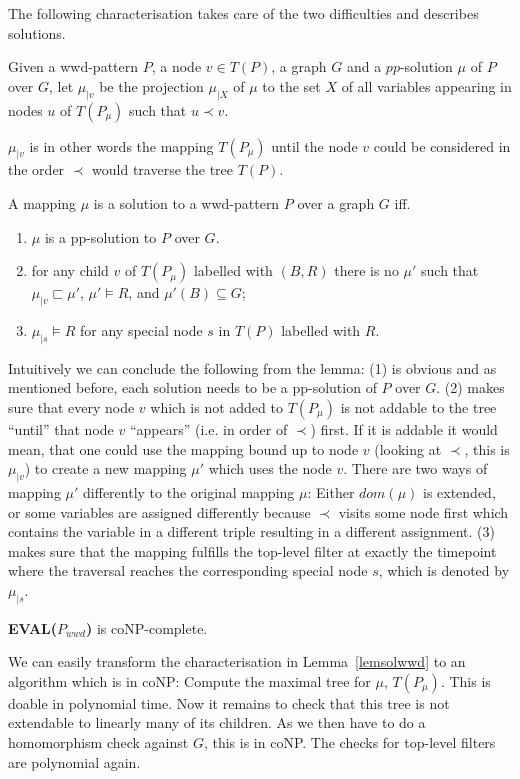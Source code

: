 The following characterisation takes care of the two difficulties and describes
solutions.
\begin{definition}
	Given a wwd-pattern $P$, a node $v \in T(P)$, a graph $G$ and a
	$pp$-solution $\mu$ of $P$ over $G$, let $\mu_{|v}$ be the projection
	$\mu_{|X}$ of $\mu$ to the set $X$ of all variables appearing in nodes $u$
	of $T(P_\mu)$ such that $u \prec v$.
\end{definition}
$\mu_{|v}$ is in other words the mapping $T(P_\mu)$ until the node $v$ could be
considered in the order $\prec$ would traverse the tree $T(P)$.
\begin{lemma}\label{lemsolwwd}
	A mapping $\mu$ is a solution to a wwd-pattern $P$ over a graph $G$ iff. 
	\begin{enumerate}
		\item $\mu$ is a pp-solution to $P$ over $G$.
		\item for any child $v$ of $T(P_\mu)$ labelled with $(B,R)$ there is no
			$\mu'$ such that $\mu_{|v} \sqsubset \mu'$, $\mu' \models R$, and
			$\mu'(B) \subseteq G$;
		\item $\mu_{|s} \models R$ for any special node $s$ in $T(P)$ labelled
			with $R$.
	\end{enumerate}
\end{lemma}
Intuitively we can conclude the following from the lemma: (1) is obvious and as
mentioned before, each solution needs to be a pp-solution of $P$ over $G$.
(2) makes sure that every node $v$ which is not added to $T(P_\mu)$ is not addable
to the tree ``until'' that node $v$ ``appears'' (i.e. in order of $\prec$) first. 
If it is addable it would mean,
that one could use the mapping bound up to node $v$ (looking at $\prec$, this is
$\mu_{|v}$) to create a new mapping
$\mu'$ which uses the node $v$. There are two ways of mapping $\mu'$
differently to the original mapping $\mu$: Either $dom(\mu)$ is extended, or
some variables are assigned differently because $\prec$ visits some node first
which contains the variable in a different triple resulting in a different
assignment.
(3) makes sure that the mapping fulfills the top-level filter at exactly the
timepoint where the traversal reaches the corresponding special node $s$, which
is denoted by $\mu_{|s}$.

\begin{theorem}
	\textbf{EVAL($P_{wwd}$)} is coNP-complete.
\end{theorem}
\begin{proofidea}
	We can easily transform the characterisation in
	Lemma~\ref{lemsolwwd} to an	algorithm which is in coNP: 
	Compute the maximal tree for $\mu$, $T(P_\mu)$. This is doable in polynomial
	time. Now it remains to check that this tree is not extendable to linearly
	many of its children. As we then have to do a homomorphism check against
	$G$, this is in coNP. The checks for top-level filters are polynomial again.
\end{proofidea}

